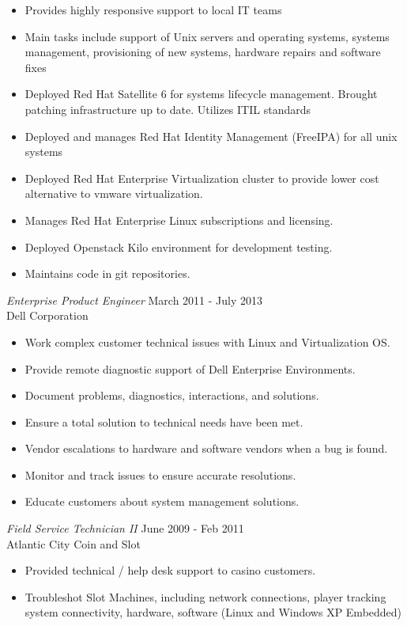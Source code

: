 \documentclass[margin]{res}
\begin{document}
\begin{resume}
\begin{itemize}
		\item Provides highly responsive support to local IT teams
		\item Main tasks include support of Unix servers and operating systems, systems management, provisioning of new systems, hardware repairs and software fixes
		\item Deployed Red Hat Satellite 6 for systems lifecycle management. Brought patching infrastructure up to date. Utilizes ITIL standards
		\item Deployed and manages Red Hat Identity Management (FreeIPA) for all unix systems
		\item Deployed Red Hat Enterprise Virtualization cluster to provide lower cost alternative to vmware virtualization.
		\item Manages Red Hat Enterprise Linux subscriptions and licensing.
		\item Deployed Openstack Kilo environment for development testing.
		\item Maintains code in git repositories.
	\end{itemize}
 	{\sl Enterprise Product Engineer} \hfill March 2011 - July 2013 \\
 	Dell Corporation
 	\begin{itemize}  \itemsep -2pt %
 		\item Work complex customer technical issues with Linux and Virtualization OS.
 		\item Provide remote diagnostic support of Dell Enterprise Environments.
 		\item Document problems, diagnostics, interactions, and solutions.
 		\item Ensure a total solution to technical needs have been met.
 		\item Vendor escalations to hardware and software vendors when a bug is found.
 		\item Monitor and track issues to ensure accurate resolutions.
 		\item Educate customers about system management solutions.
 	\end{itemize}
 	{\sl Field Service Technician II} \hfill June 2009 - Feb 2011 \\
 	Atlantic City Coin and Slot
 	\begin{itemize}  \itemsep -2pt %
 		\item Provided technical / help desk support to casino customers.
 		\item Troubleshot Slot Machines, including network connections, player tracking system connectivity, hardware, software (Linux and Windows XP Embedded)

\end{itemize}
\end{resume}
\end{document}
